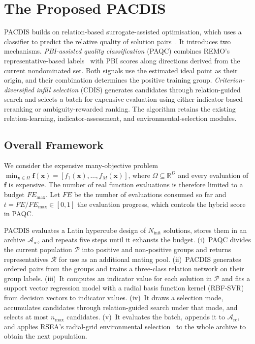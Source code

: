\documentclass[final,5p,times,twocolumn]{elsarticle}
\newcommand{\vf}{\mathbf{f}}
\newcommand{\vx}{\mathbf{x}}
\begin{document}
\section{The Proposed PACDIS}
\label{sec:method}

PACDIS builds on relation-based surrogate-assisted optimisation, which uses a
classifier to predict the relative quality of solution pairs~\cite{ref:remo}.
It introduces two mechanisms. \emph{PBI-assisted quality classification}
(PAQC) combines REMO's representative-based labels~\cite{ref:remo} with PBI
scores along directions derived from the current nondominated set. Both signals
use the estimated ideal point as their origin, and their combination determines
the positive training group. \emph{Criterion-diversified infill selection}
(CDIS) generates candidates through relation-guided search and selects a batch
for expensive evaluation using either indicator-based reranking or
ambiguity-rewarded ranking. The algorithm retains the existing relation-learning,
indicator-assessment, and environmental-selection modules.

\subsection{Overall Framework}
\label{sec:method:framework}

We consider the expensive many-objective problem
$\min_{\vx\in\Omega}\vf(\vx)=[f_1(\vx),\ldots,f_M(\vx)]$,
where $\Omega\subseteq\mathbb{R}^{D}$ and every evaluation of $\vf$ is
expensive. The number of real function evaluations is therefore limited to a
budget $FE_{\max}$. Let $FE$ be the number of
evaluations consumed so far and $t=FE/FE_{\max}\in[0,1]$ the evaluation
progress, which controls the hybrid score in PAQC.

PACDIS evaluates a Latin hypercube design of $N_{\mathrm{init}}$ solutions,
stores them in an archive $\mathcal{A}_{\mathrm{rc}}$, and repeats five steps
until it exhausts the budget. (i)~PAQC divides the current population
$\mathcal{P}$ into positive and non-positive groups and returns representatives
$\mathcal{R}$ for use as an additional mating pool.
(ii)~PACDIS generates ordered pairs from the groups and trains a three-class
relation network on their group labels. (iii)~It computes an indicator value
for each solution in $\mathcal{P}$ and fits a support vector regression model
with a radial basis function kernel (RBF-SVR) from decision vectors to indicator
values. (iv)~It draws a selection mode, accumulates
candidates through relation-guided search under that mode, and selects at most
$n_{\max}$ candidates. (v)~It evaluates the batch, appends it to
$\mathcal{A}_{\mathrm{rc}}$, and applies RSEA's radial-grid environmental
selection~\cite{ref:rsea} to the whole archive to obtain the next population.
\end{document}
